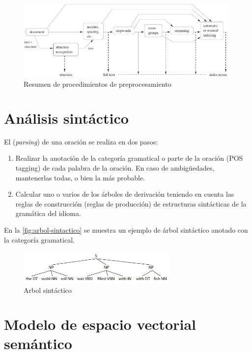\begin{figure}[H]
\includegraphics[width=0.98\textwidth]{procesamiento-textos-mod-ir}
\caption[Resumen de procedimientos de preprocesamiento]{Resumen de procedimientos de preprocesamiento \citep[ch. 7]{Baeza-Yates2011}}
\end{figure}

\section{Análisis sintáctico}

El  (\emph{parsing}) de una oración se realiza en dos pasos:
\begin{enumerate}
\item Realizar la anotación de la categoría gramatical o parte de la oración (POS tagging) de cada palabra de la oración. En caso de ambigüedades, mantenerlas todas, o bien la más probable.
\item Calcular uno o varios de los árboles de derivación teniendo en cuenta las reglas de construcción (reglas de producción) de estructuras sintácticas de la gramática del idioma.
\end{enumerate}

En la \autoref{fig:arbol-sintactico} se muestra un ejemplo de árbol sintáctico anotado con la categoría gramatical.

\begin{figure}[htbp]
\centering
\includegraphics[width=0.7\textwidth]{arbol-sintactico}
\caption{Arbol sintáctico}
\label{fig:arbol-sintactico}
\end{figure}

\section{Modelo de espacio vectorial semántico}

